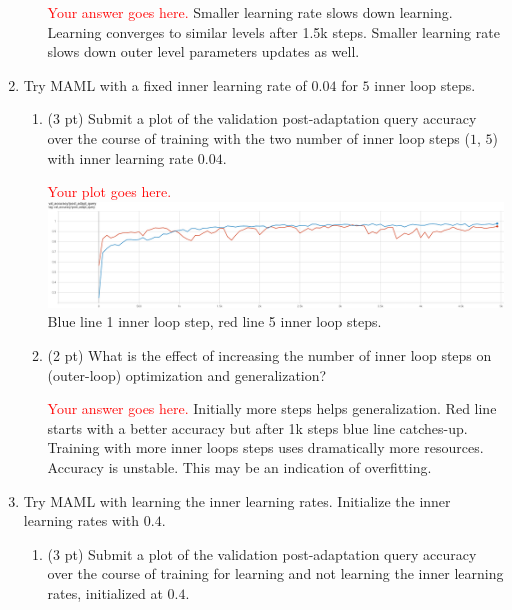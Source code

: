 \documentclass[12pt]{article}
\begin{document}
\begin{enumerate}
\begin{enumerate}
        \textcolor{red}{Your answer goes here.}
        \break Smaller learning rate slows down learning. Learning converges to similar levels after 1.5k steps. Smaller learning rate slows down outer level parameters updates as well.

    \end{enumerate}
    
    \newpage
    \item Try MAML with a fixed inner learning rate of $0.04$ for $5$ inner loop steps.
    \begin{enumerate} %
        \item (3 pt) Submit a plot of the validation post-adaptation query accuracy over the course of training with the two number of inner loop steps ($1$, $5$) with inner learning rate $0.04$.
  
        \textcolor{red}{Your plot goes here.}
        \break
        \includegraphics[width=1.0\linewidth]{figures/maml-q4-a-val-post-query-compare}
        \break Blue line 1 inner loop step, red line 5 inner loop steps.
        \item (2 pt) What is the effect of increasing the number of inner loop steps on (outer-loop) optimization and generalization?
        
        \textcolor{red}{Your answer goes here.}
        \break Initially more steps helps generalization. Red line starts with a better accuracy but after 1k steps blue line catches-up. Training with more inner loops steps uses dramatically more resources. Accuracy is unstable. This may be an indication of overfitting.
    \end{enumerate}

    \newpage
    \item Try MAML with learning the inner learning rates. Initialize the inner learning rates with $0.4$.
    \begin{enumerate} %
        \item (3 pt) Submit a plot of the validation post-adaptation query accuracy over the course of training for learning and not learning the inner learning rates, initialized at $0.4$. 


\end{enumerate}
\end{enumerate}
\end{document}

